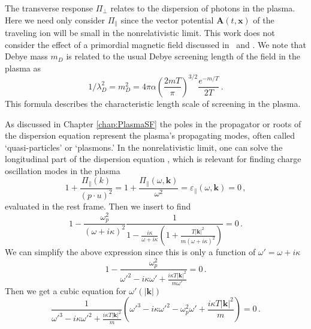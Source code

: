 The transverse response $\Pi_{\perp}$ relates to the dispersion of photons in the plasma. Here we need only consider $\Pi_\parallel$ since the vector potential $\boldsymbol{A}(t,\boldsymbol{x})$ of the traveling ion will be small in the nonrelativistic limit. This work does not consider the effect of a primordial magnetic field discussed in~\cite{Steinmetz:2023nsc} and . We note that Debye mass $m_D$ is related to the usual Debye screening length of the field in the plasma as
\begin{equation}\label{eq:mL}
	1/\lambda_D^{2} = m_D^2= 4 \pi \alpha \left(\frac{2mT}{\pi}\right)^{3/2}\frac{e^{-m/T}}{2T}\,.
\end{equation}
This formula describes the characteristic length scale of screening in the plasma.

As discussed in Chapter \ref{chap:PlasmaSF} the poles in the propagator or roots of the dispersion equation represent the plasma's propagating modes, often called `quasi-particles' or `plasmons.' In the nonrelativistic limit, one can solve the longitudinal part of the dispersion equation , which is relevant for finding charge oscillation modes in the plasma
\begin{equation}
    1+ \frac{\Pi_\parallel( k)}{(p\cdot u)^2}= 1+ \frac{\Pi_\parallel(\omega, \boldsymbol{k})}{\omega^2}=\varepsilon_\parallel(\omega,\boldsymbol{k}) =0 \,,
\end{equation}
evaluated in the rest frame. Then we insert  to find
\begin{equation}
   1- \frac{\omega_p^2}{(\omega+ i \kappa)^2} \frac{1}{1-\frac{i\kappa}{\omega+ i \kappa}\left(1+\frac{T |\boldsymbol{k}|^2}{m(\omega+ i \kappa)^2} \right)}=0 \,.
\end{equation}
We can simplify the above expression since this is only a function of $\omega' =\omega+i\kappa$
\begin{equation}
   1- \frac{\omega_p^2}{\omega'^2-i\kappa\omega'+\frac{i\kappa T |\boldsymbol{k}|^2}{m \omega'} }=0 \,.
\end{equation}
Then we get a cubic equation for $\omega'(|\boldsymbol{k}|)$
\begin{equation}\label{eq:dispfact}
   \frac{1}{\omega'^3-i\kappa\omega'^2+\frac{i\kappa T |\boldsymbol{k}|^2}{m} }
    \left(\omega'^3-i\kappa\omega'^2 - \omega_p^2\omega'+\frac{i\kappa T |\boldsymbol{k}|^2}{m} \right)=0 \,.
\end{equation}
